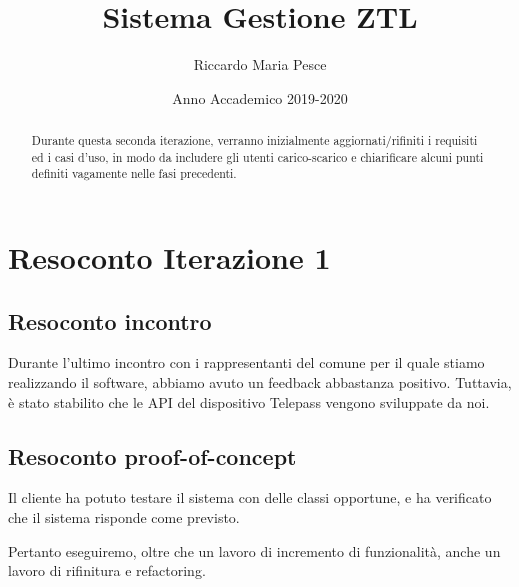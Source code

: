 \documentclass[12pt, letterpaper]{article}
\title{Sistema Gestione ZTL}
\author{Riccardo Maria Pesce}
\date{Anno Accademico 2019-2020}
\begin{document}
\begin{titlepage}

\maketitle

\begin{abstract}

\noindent
Durante questa seconda iterazione, verranno 
inizialmente aggiornati/rifiniti i requisiti
ed i casi d'uso, in modo da includere gli 
utenti carico-scarico e chiarificare 
alcuni punti definiti vagamente nelle fasi 
precedenti.

\end{abstract}
\end{titlepage}

\tableofcontents{}

\pagebreak

\section{Resoconto Iterazione 1}

\subsection{Resoconto incontro}
Durante l'ultimo incontro con i rappresentanti
del comune per il quale stiamo realizzando il 
software, abbiamo avuto un feedback abbastanza
positivo. Tuttavia, è stato stabilito che le 
API del dispositivo Telepass vengono sviluppate
da noi.

\subsection{Resoconto proof-of-concept}
Il cliente ha potuto testare il sistema 
con delle classi opportune, e ha verificato 
che il sistema risponde come previsto.

\noindent
Pertanto eseguiremo, oltre che un lavoro di 
incremento di funzionalità, anche un lavoro 
di rifinitura e refactoring.
\end{document}

